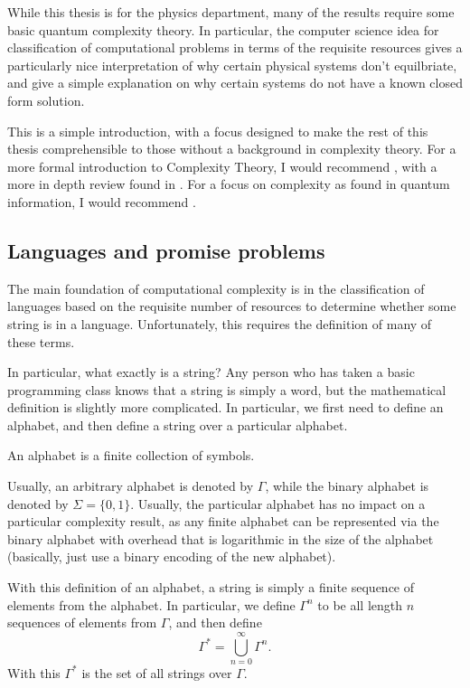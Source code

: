 \documentclass[../thesis-main/thesis-main]{subfiles}
\begin{document}
While this thesis is for the physics department, many of the results require some basic quantum complexity theory.  In particular, the computer science idea for classification of computational problems in terms of the requisite resources gives a particularly nice interpretation of why certain physical systems don't equilbriate, and give a simple explanation on why certain systems do not have a known closed form solution.

This is a simple introduction, with a focus designed to make the rest of this thesis comprehensible to those without a background in complexity theory.  For a more formal introduction to Complexity Theory, I would recommend \cite{SipserToC}, with a more in depth review found in \cite{ABCC}.  For a focus on complexity as found in quantum information, I would recommend \cite{Wat09}.

\subsection{Languages and promise problems}

The main foundation of computational complexity is in the classification of languages based on the requisite number of resources to determine whether some string is in a language.  Unfortunately, this requires the definition of many of these terms.  

In particular, what exactly is a string?  Any person who has taken a basic programming class knows that a string is simply a word, but the mathematical definition is slightly more complicated.  In particular, we first need to define an alphabet, and then define a string over a particular alphabet.  
\begin{definition}[Alphabet] An alphabet is a finite collection of symbols.
\end{definition}
Usually, an arbitrary alphabet is denoted by $\Gamma$, while the binary alphabet is denoted by $\Sigma = \{0,1\}$.  Usually, the particular alphabet has no impact on a particular complexity result, as any finite alphabet can be represented via the binary alphabet with overhead that is logarithmic in the size of the alphabet (basically, just use a binary encoding of the new alphabet).  

With this definition of an alphabet, a string is simply a finite sequence of elements from the alphabet.  In particular, we define $\Gamma^n$ to be all length $n$ sequences of elements from $\Gamma$, and then define
\begin{equation}
  \Gamma^* = \bigcup_{n=0}^\infty \Gamma^n.
\end{equation}
With this $\Gamma^*$ is the set of all strings over $\Gamma$.
\end{document}
